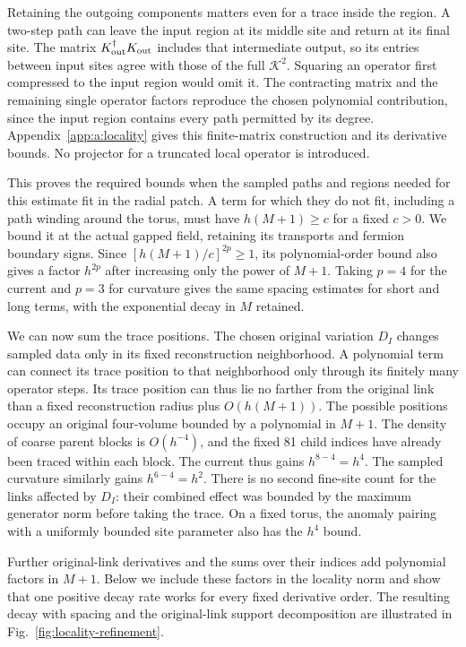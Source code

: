 \documentclass[11pt,a4paper]{article}
\theoremstyle{remark}
\begin{document}
Retaining the outgoing components matters even for a trace inside the
region. A two-step path can leave the input region at its middle site
and return at its final site. The matrix
$K_{\rm out}^\dagger K_{\rm out}$ includes that intermediate output,
so its entries between input sites agree with those of the full
$\mathcal K^2$. Squaring an operator first compressed to the input
region would omit it. The contracting matrix and the remaining single
operator factors reproduce the chosen polynomial contribution, since
the input region contains every path permitted by its degree.
Appendix~\ref{app:a:locality} gives this finite-matrix construction and
its derivative bounds. No projector for a truncated local operator is
introduced.

This proves the required bounds when the sampled paths and regions
needed for this estimate fit in the radial patch. A term for which they
do not fit, including a path
winding around the torus, must have $h(M+1)\ge c$ for a fixed $c>0$.
We bound it at the actual
gapped field, retaining its transports and fermion boundary signs.
Since $[h(M+1)/c]^{2p}\ge1$, its polynomial-order bound also
gives a factor $h^{2p}$ after increasing only the power of $M+1$.
Taking $p=4$ for the current and $p=3$ for curvature gives the same
spacing estimates for short and long terms, with the exponential decay
in $M$ retained.

We can now sum the trace positions. The chosen original variation $D_I$
changes sampled data only in its fixed reconstruction neighborhood.
A polynomial term can connect its trace position to that neighborhood
only through its finitely many operator steps. Its trace position can
thus lie no farther from the original link than a fixed reconstruction
radius plus $O(h(M+1))$. The possible positions occupy an original
four-volume bounded by a polynomial in $M+1$. The density of coarse parent
blocks is $O(h^{-4})$, and the fixed 81 child indices have already
been traced within each block. The current thus gains $h^{8-4}=h^4$.
The sampled curvature similarly gains $h^{6-4}=h^2$. There is no
second fine-site count for the links affected by $D_I$: their combined
effect was bounded by the maximum generator norm before taking the trace.
On a fixed torus, the anomaly pairing with a uniformly bounded site
parameter also has the $h^4$ bound.

Further original-link derivatives and the sums over their indices add
polynomial factors in $M+1$. Below we include these factors in the
locality norm and show that one positive decay rate works for every
fixed derivative order. The resulting decay with spacing and the
original-link support decomposition are illustrated in
Fig.~\ref{fig:locality-refinement}.
\end{document}
